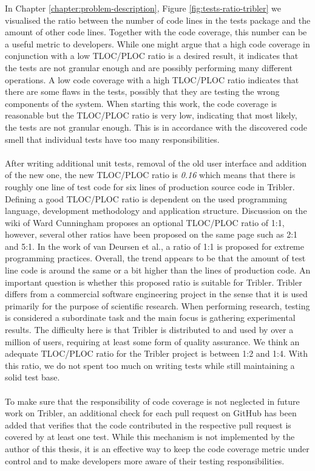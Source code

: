 In Chapter \ref{chapter:problem-description}, Figure \ref{fig:tests-ratio-tribler} we visualised the ratio between the number of code lines in the tests package and the amount of other code lines. Together with the code coverage, this number can be a useful metric to developers. While one might argue that a high code coverage in conjunction with a low TLOC/PLOC ratio is a desired result, it indicates that the tests are not granular enough and are possibly performing many different operations. A low code coverage with a high TLOC/PLOC ratio indicates that there are some flaws in the tests, possibly that they are testing the wrong components of the system. When starting this work, the code coverage is reasonable but the TLOC/PLOC ratio is very low, indicating that most likely, the tests are not granular enough. This is in accordance with the discovered code smell that individual tests have too many responsibilities.\\\\
After writing additional unit tests, removal of the old user interface and addition of the new one, the new TLOC/PLOC ratio is \emph{0.16} which means that there is roughly one line of test code for six lines of production source code in Tribler. Defining a good TLOC/PLOC ratio is dependent on the used programming language, development methodology and application structure. Discussion on the wiki of Ward Cunningham\cite{c2tlcratio} proposes an optional TLOC/PLOC ratio of 1:1, however, several other ratios have been proposed on the same page such as 2:1 and 5:1. In the work of van Deursen et al.\cite{van2001refactoring}, a ratio of 1:1 is proposed for extreme programming practices. Overall, the trend appears to be that the amount of test line code is around the same or a bit higher than the lines of production code. An important question is whether this proposed ratio is suitable for Tribler. Tribler differs from a commercial software engineering project in the sense that it is used primarily for the purpose of scientific research. When performing research, testing is considered a subordinate task and the main focus is gathering experimental results. The difficulty here is that Tribler is distributed to and used by over a million of users, requiring at least some form of quality assurance. We think an adequate TLOC/PLOC ratio for the Tribler project is between 1:2 and 1:4. With this ratio, we do not spent too much on writing tests while still maintaining a solid test base.\\\\
To make sure that the responsibility of code coverage is not neglected in future work on Tribler, an additional check for each pull request on GitHub has been added that verifies that the code contributed in the respective pull request is covered by at least one test. While this mechanism is not implemented by the author of this thesis, it is an effective way to keep the code coverage metric under control and to make developers more aware of their testing responsibilities.

